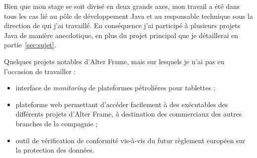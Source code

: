 Bien que mon stage se soit divisé en deux grands axes, mon travail a été dans tous les cas lié au pôle de développement Java et au responsable technique sous la direction de qui j'ai travaillé. En conséquence j'ai participé à plusieurs projets Java de manière anecdotique, en plus du projet principal que je détaillerai en partie~\ref{sec:sujet}.

Quelques projets notables d'Alter Frame, mais sur lesquels je n'ai pas eu l'occasion de travailler :
\begin{itemize}
	\item interface de \textit{monitoring} de plateformes pétrolières pour tablettes ;
	\item plateforme web permettant d'accéder facilement à des exécutables des différents projets d'Alter Frame, à destination des commerciaux des autres branches de la compagnie ;
	\item outil de vérification de conformité vis-à-vis du futur règlement européen sur la protection des données\cite{cnil}.
\end{itemize}